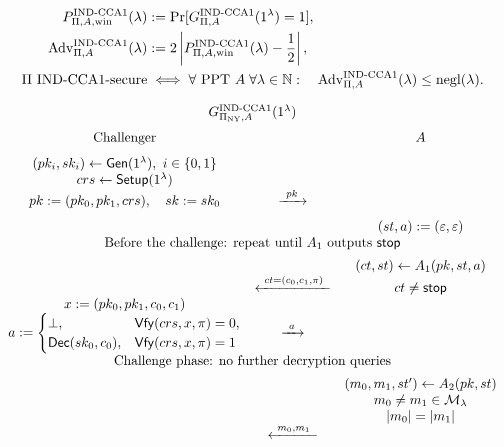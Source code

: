 \documentclass[12pt,a4paper]{article}
\begin{document}
\begin{definition}
\[
\begin{aligned}
P_{\Pi,A,\mathrm{win}}^{\mathrm{IND\text{-}CCA1}}(\lambda)
&:=\Pr[G_{\Pi,A}^{\mathrm{IND\text{-}CCA1}}(1^\lambda)=1],\\
\operatorname{Adv}_{\Pi,A}^{\mathrm{IND\text{-}CCA1}}(\lambda)
&:=2\left|P_{\Pi,A,\mathrm{win}}^{\mathrm{IND\text{-}CCA1}}(\lambda)-\frac12\right|,\\
\Pi\text{ IND-CCA1-secure}
&\iff\forall\text{ PPT }A\;\forall\lambda\in\mathbb N:\quad
\operatorname{Adv}_{\Pi,A}^{\mathrm{IND\text{-}CCA1}}(\lambda)\leq\operatorname{negl}(\lambda).
\end{aligned}
\]
\end{definition}

\clearpage
\begin{definition}
\begingroup\small
\[
\begin{array}{c@{\quad}c@{\quad}c}
\multicolumn{3}{c}{G_{\Pi_{\mathrm{NY}},A}^{\mathrm{IND\text{-}CCA1}}(1^\lambda)}\\[7pt]
\text{Challenger}&&A\\[7pt]
(pk_i,sk_i)\leftarrow\mathsf{Gen}(1^\lambda),\ i\in\{0,1\}&&\\
crs\leftarrow\mathsf{Setup}(1^\lambda)&&\\
pk:=(pk_0,pk_1,crs),\quad sk:=sk_0
&\xrightarrow{\ pk\ }&\\[7pt]
&&(st,a):=(\varepsilon,\varepsilon)\\
\multicolumn{3}{c}{\text{Before the challenge: repeat until }A_1\text{ outputs }\mathsf{stop}}\\[5pt]
&&(ct,st)\leftarrow A_1(pk,st,a)\\
&\xleftarrow{\ ct=(c_0,c_1,\pi)\ }&ct\ne\mathsf{stop}\\
x:=(pk_0,pk_1,c_0,c_1)&&\\
a:=\begin{cases}
\bot,&\mathsf{Vfy}(crs,x,\pi)=0,\\
\mathsf{Dec}(sk_0,c_0),&\mathsf{Vfy}(crs,x,\pi)=1
\end{cases}
&\xrightarrow{\ a\ }&\\[9pt]
\multicolumn{3}{c}{\text{Challenge phase: no further decryption queries}}\\[5pt]
&&(m_0,m_1,st')\leftarrow A_2(pk,st)\\
&&m_0\ne m_1\in\mathcal M_\lambda\\
&&|m_0|=|m_1|\\
&\xleftarrow{\ m_0,m_1\ }&\\

\end{array}\]
\end{definition}
\end{document}

